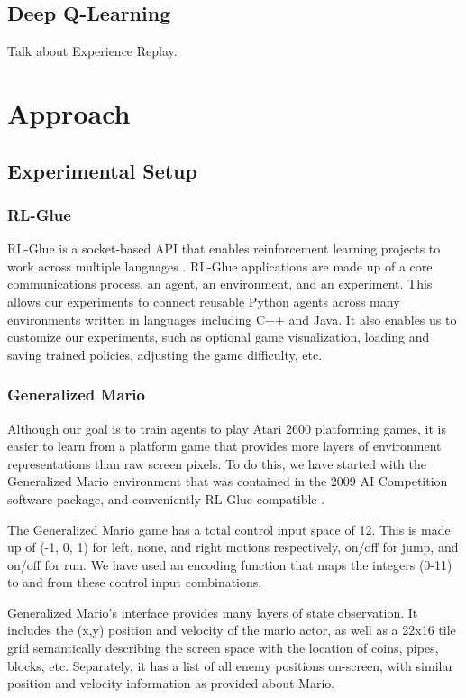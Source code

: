 \documentclass{article}
\begin{document}
\subsection{Deep Q-Learning}
\cite{Mnih13}

Talk about Experience Replay.

\section{Approach}

\subsection{Experimental Setup}

\subsubsection{RL-Glue}
RL-Glue is a socket-based API that enables reinforcement learning projects to work across multiple languages \cite{Tanner09}. RL-Glue applications are made up of a core communications process, an agent, an environment, and an experiment. This allows our experiments to connect reusable Python agents across many environments written in languages including C++ and Java. It also enables us to customize our experiments, such as optional game visualization, loading and saving trained policies, adjusting the game difficulty, etc.

\subsubsection{Generalized Mario}
Although our goal is to train agents to play Atari 2600 platforming games, it is easier to learn from a platform game that provides more layers of environment representations than raw screen pixels. To do this, we have started with the Generalized Mario environment that was contained in the 2009 AI Competition software package, and conveniently RL-Glue compatible \cite{Togelius10}.

The Generalized Mario game has a total control input space of 12. This is made up of (-1, 0, 1) for left, none, and right motions respectively, on/off for jump, and on/off for run. We have used an encoding function that maps the integers (0-11) to and from these control input combinations. 

Generalized Mario's interface provides many layers of state observation. It includes the (x,y) position and velocity of the mario actor, as well as a 22x16 tile grid semantically describing the screen space with the location of coins, pipes, blocks, etc. Separately, it has a list of all enemy positions on-screen, with similar position and velocity information as provided about Mario. 
\end{document}
